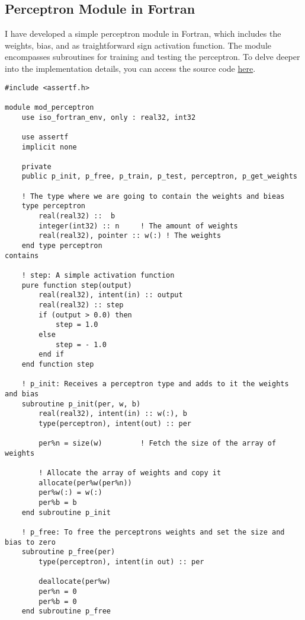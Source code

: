 \label{sec:perceptron-module-fortran}
\subsection{Perceptron Module in Fortran}
I have developed a simple perceptron module in Fortran, which includes the weights, bias, and as
traightforward sign activation function. The module encompasses subroutines for training and testing the
perceptron. To delve deeper into the implementation details, you can access the source code
\href{https://github.com/alecksandr26/fortran-ml/tree/main/src/mod_perceptron.f90}{here}.

\begin{lstlisting}
#include <assertf.h>

module mod_perceptron
    use iso_fortran_env, only : real32, int32
 
    use assertf
    implicit none

    private
    public p_init, p_free, p_train, p_test, perceptron, p_get_weights

    ! The type where we are going to contain the weights and bieas
    type perceptron
        real(real32) ::  b
        integer(int32) :: n     ! The amount of weights
        real(real32), pointer :: w(:) ! The weights
    end type perceptron
contains
    
    ! step: A simple activation function
    pure function step(output)
        real(real32), intent(in) :: output
        real(real32) :: step
        if (output > 0.0) then
            step = 1.0
        else
            step = - 1.0
        end if
    end function step
    
    ! p_init: Receives a perceptron type and adds to it the weights and bias
    subroutine p_init(per, w, b)
        real(real32), intent(in) :: w(:), b
        type(perceptron), intent(out) :: per

        per%n = size(w)         ! Fetch the size of the array of weights
        
        ! Allocate the array of weights and copy it
        allocate(per%w(per%n))
        per%w(:) = w(:)
        per%b = b
    end subroutine p_init

    ! p_free: To free the perceptrons weights and set the size and bias to zero
    subroutine p_free(per)
        type(perceptron), intent(in out) :: per
        
        deallocate(per%w)
        per%n = 0
        per%b = 0
    end subroutine p_free
        

\end{lstlisting}
